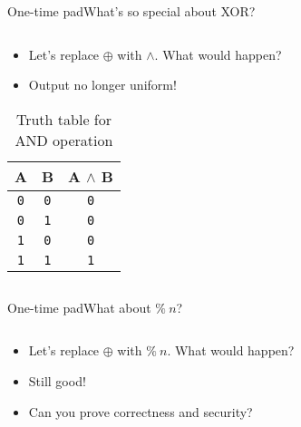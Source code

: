 \documentclass[aspectratio=169, lualatex, handout]{beamer}
\begin{document}
\begin{frame}{One-time pad}{What's so special about XOR?}
	\begin{columns}[c]
		\begin{column}{0.7\textwidth}
			\begin{itemize}[<+->]
				\item Let's replace $\oplus$ with $\land$. What would happen?
				\item Output no longer uniform!
			\end{itemize}
			\begin{table}
				\centering
				\begin{tabular}{|c|c|c|}
					\hline
					\textbf{A} & \textbf{B} & \textbf{A $\land$ B} \\
					\hline
					\texttt{0} & \texttt{0} & \texttt{0}           \\
					\hline
					\texttt{0} & \texttt{1} & \texttt{0}           \\
					\hline
					\texttt{1} & \texttt{0} & \texttt{0}           \\
					\hline
					\texttt{1} & \texttt{1} & \texttt{1}           \\
					\hline
				\end{tabular}
				\caption{Truth table for AND operation}
			\end{table}
		\end{column}
		\begin{column}{0.3\textwidth}
		\end{column}
	\end{columns}
\end{frame}

\begin{frame}{One-time pad}{What about $\%\ n$?}
	\begin{columns}[c]
		\begin{column}{0.5\textwidth}
			\begin{itemize}[<+->]
				\item Let's replace $\oplus$ with $\%\ n$. What would happen?
				\item Still good!
				\item Can you prove correctness and security?
			\end{itemize}
		\end{column}
		\begin{column}{0.5\textwidth}
		\end{column}
	\end{columns}
\end{frame}

\begin{frame}[plain]
	\titlepage
\end{frame}
\end{document}
